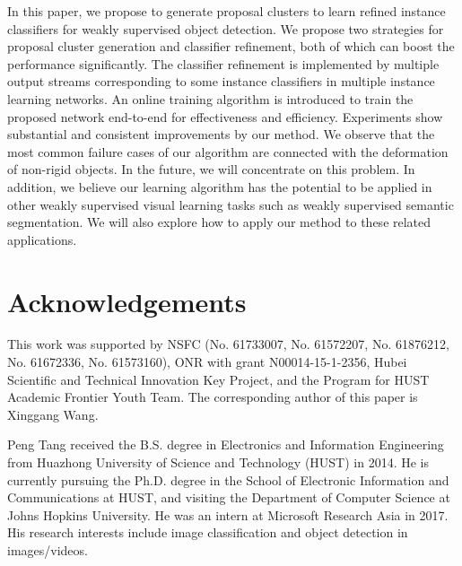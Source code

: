 \documentclass[10pt,journal,compsoc]{IEEEtran}
\begin{document}
In this paper, we propose to generate proposal clusters to learn refined instance classifiers for weakly supervised object detection.
We propose two strategies for proposal cluster generation and classifier refinement,
both of which can boost the performance significantly.
The classifier refinement is implemented by multiple output streams corresponding to some instance classifiers in multiple instance learning networks.
An online training algorithm is introduced to train the proposed network end-to-end for effectiveness and efficiency.
Experiments show substantial and consistent improvements by our method.
We observe that the most common failure cases of our algorithm are connected with the deformation of non-rigid objects.
In the future, we will concentrate on this problem.
In addition, we believe our learning algorithm has the potential to be applied in other weakly supervised visual learning tasks such as weakly supervised semantic segmentation.
We will also explore how to apply our method to these related applications.



\section*{Acknowledgements}
This work was supported by NSFC (No. 61733007, No. 61572207, No. 61876212, No. 61672336, No. 61573160), ONR with grant N00014-15-1-2356, Hubei Scientific and Technical Innovation Key Project, and the Program for HUST Academic Frontier Youth Team. The corresponding author of this paper is Xinggang Wang.



\ifCLASSOPTIONcaptionsoff
  \newpage
\fi










\begin{IEEEbiography}{Peng Tang}
received the B.S. degree in Electronics and Information Engineering from Huazhong University of Science and Technology (HUST) in 2014.
He is currently pursuing the Ph.D. degree in the School of Electronic Information and Communications at HUST,
and visiting the Department of Computer Science at Johns Hopkins University.
He was an intern at Microsoft Research Asia in 2017.
His research interests include image classification and object detection in images/videos.
\end{IEEEbiography}
\end{document}
